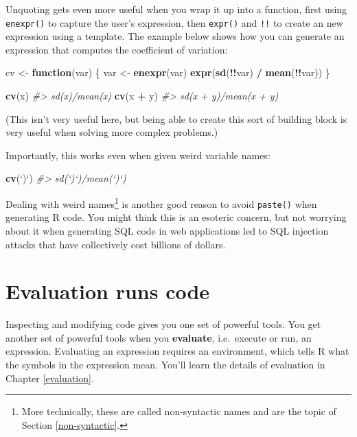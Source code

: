 \documentclass[]{book}
\newenvironment{Shaded}{\begin{snugshade}}{\end{snugshade}}
\newcommand{\CommentTok}[1]{\textcolor[rgb]{0.37,0.37,0.37}{\textit{#1}}}
\newcommand{\ControlFlowTok}[1]{\textcolor[rgb]{0.27,0.27,0.27}{\textbf{#1}}}
\newcommand{\DataTypeTok}[1]{\textcolor[rgb]{0.27,0.27,0.27}{#1}}
\newcommand{\KeywordTok}[1]{\textcolor[rgb]{0.27,0.27,0.27}{\textbf{#1}}}
\newcommand{\NormalTok}[1]{#1}
\newcommand{\OperatorTok}[1]{\textcolor[rgb]{0.43,0.43,0.43}{\textbf{#1}}}
\newcommand{\StringTok}[1]{\textcolor[rgb]{0.5,0.5,0.5}{#1}}
\let\rmarkdownfootnote\footnote%
\def\footnote{\protect\rmarkdownfootnote}
\begin{document}
Unquoting gets even more useful when you wrap it up into a function, first using \texttt{enexpr()} to capture the user's expression, then \texttt{expr()} and \texttt{!!} to create an new expression using a template. The example below shows how you can generate an expression that computes the coefficient of variation:

\begin{Shaded}
\begin{Highlighting}[]
\NormalTok{cv <-}\StringTok{ }\ControlFlowTok{function}\NormalTok{(var) \{}
\NormalTok{  var <-}\StringTok{ }\KeywordTok{enexpr}\NormalTok{(var)}
  \KeywordTok{expr}\NormalTok{(}\KeywordTok{sd}\NormalTok{(}\OperatorTok{!!}\NormalTok{var) }\OperatorTok{/}\StringTok{ }\KeywordTok{mean}\NormalTok{(}\OperatorTok{!!}\NormalTok{var))}
\NormalTok{\}}

\KeywordTok{cv}\NormalTok{(x)}
\CommentTok{#> sd(x)/mean(x)}
\KeywordTok{cv}\NormalTok{(x }\OperatorTok{+}\StringTok{ }\NormalTok{y)}
\CommentTok{#> sd(x + y)/mean(x + y)}
\end{Highlighting}
\end{Shaded}

(This isn't very useful here, but being able to create this sort of building block is very useful when solving more complex problems.)

Importantly, this works even when given weird variable names:

\begin{Shaded}
\begin{Highlighting}[]
\KeywordTok{cv}\NormalTok{(}\StringTok{`}\DataTypeTok{)}\StringTok{`}\NormalTok{)}
\CommentTok{#> sd(`)`)/mean(`)`)}
\end{Highlighting}
\end{Shaded}

Dealing with weird names\footnote{More technically, these are called non-syntactic names and are the topic of Section \ref{non-syntactic}.} is another good reason to avoid \texttt{paste()} when generating R code. You might think this is an esoteric concern, but not worrying about it when generating SQL code in web applications led to SQL injection attacks that have collectively cost billions of dollars.

\hypertarget{eval-intro}{%
\section{Evaluation runs code}\label{eval-intro}}

Inspecting and modifying code gives you one set of powerful tools. You get another set of powerful tools when you \textbf{evaluate}, i.e.~execute or run, an expression. Evaluating an expression requires an environment, which tells R what the symbols in the expression mean. You'll learn the details of evaluation in Chapter \ref{evaluation}.
\end{document}
